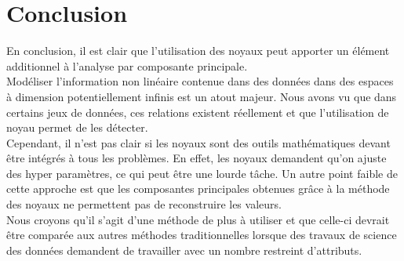 \section{Conclusion}

En conclusion, il est clair que l'utilisation des noyaux peut apporter un élément additionnel à l'analyse par composante principale.\\

Modéliser l'information non linéaire contenue dans des données dans des espaces à dimension potentiellement infinis est un atout majeur.
Nous avons vu que dans certains jeux de données, ces relations existent réellement et que l'utilisation de noyau permet de les détecter.\\

Cependant, il n'est pas clair si les noyaux sont des outils mathématiques devant être intégrés à tous les problèmes. 
En effet, les noyaux demandent qu'on ajuste des hyper paramètres, ce qui peut être une lourde tâche. Un autre point faible de 
cette approche est que les composantes principales obtenues grâce à la méthode des noyaux ne permettent pas de reconstruire les 
valeurs. \\

Nous croyons qu'il s'agit d'une méthode de plus à utiliser et que celle-ci devrait être comparée aux autres méthodes
traditionnelles lorsque des travaux de science des données demandent de travailler avec un nombre restreint d'attributs.